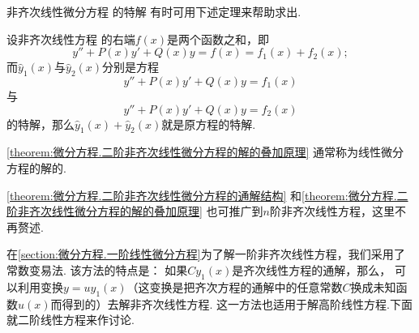 非齐次线性微分方程  的特解
有时可用下述定理来帮助求出.
\begin{theorem}\label{theorem:微分方程.二阶非齐次线性微分方程的解的叠加原理}
设非齐次线性方程 
的右端\(f(x)\)是两个函数之和，即\[
	y''+P(x)y'+Q(x)y
	=f(x)
	=f_1(x)+f_2(x);
\]而\(\hat{y}_1(x)\)与\(\hat{y}_2(x)\)分别是方程\[
	y''+P(x)y'+Q(x)y=f_1(x)
\]与\[
	y''+P(x)y'+Q(x)y=f_2(x)
\]的特解，那么\(\hat{y}_1(x)+\hat{y}_2(x)\)就是原方程的特解.
\end{theorem}

\cref{theorem:微分方程.二阶非齐次线性微分方程的解的叠加原理}
通常称为线性微分方程的解的.

\cref{theorem:微分方程.二阶非齐次线性微分方程的通解结构} 和\cref{theorem:微分方程.二阶非齐次线性微分方程的解的叠加原理} 也可推广到\(n\)阶非齐次线性方程，这里不再赘述.

在\cref{section:微分方程.一阶线性微分方程}为了解一阶非齐次线性方程，我们采用了常数变易法.
该方法的特点是：
如果\(C y_1(x)\)是齐次线性方程的通解，那么，
可以利用变换\(y = u y_1(x)\)（这变换是把齐次方程的通解中的任意常数\(C\)换成未知函数\(u(x)\)而得到的）去解非齐次线性方程.
这一方法也适用于解高阶线性方程.下面就二阶线性方程来作讨论.

